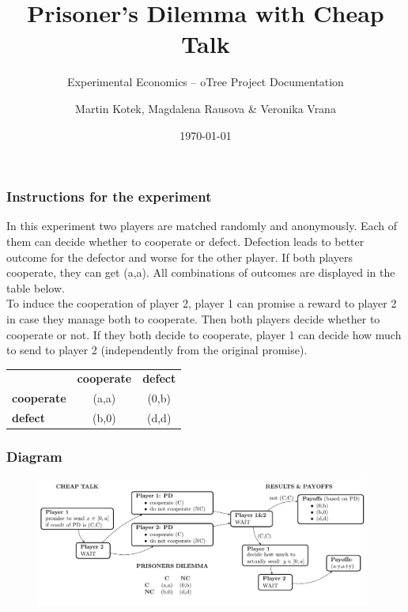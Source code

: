 \documentclass{beamer}
\title{Prisoner's Dilemma with Cheap Talk}
\subtitle{Experimental Economics -- oTree Project Documentation}
\author{Martin Kotek, Magdalena Rausova \& Veronika Vrana}
\date{\today}
\begin{document}
\frame{\titlepage} 



\begin{frame}
\frametitle{Instructions for the experiment}

\justify
In this experiment two players are matched randomly and anonymously. Each of them can decide whether to cooperate or defect. Defection leads to better outcome for the defector and worse for the other player. If both players cooperate, they can get (a,a). All combinations of outcomes are displayed in the table below.\\

To induce the cooperation of player 2, player 1 can promise a reward to player 2 in case they manage both to cooperate. Then both players decide whether to cooperate or not. If they both decide to cooperate, player 1 can decide how much to send to player 2 (independently from the original promise).\\

\begin{center}
   \begin{tabular}{lcc}
     & \textbf{cooperate} &  \textbf{defect} \\
      \textbf{cooperate} &  (a,a) & (0,b) \\
      \textbf{defect} & (b,0) & (d,d) \\    
 \end{tabular}
\end{center}

\end{frame}




\begin{frame}
\frametitle{Diagram} 

\begin{figure}[!htbp]
\begin{center}\vspace{-0.5cm}
\includegraphics[width=110mm]{diagram.pdf}
\end{center}\vspace{-0.5cm}
\end{figure}

\end{frame}
\end{document}
